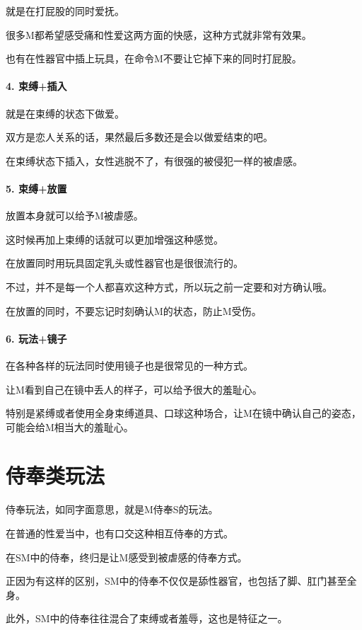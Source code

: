 \documentclass[12pt,UTF8]{ctexbook}
\begin{document}
就是在打屁股的同时爱抚。

很多M都希望感受痛和性爱这两方面的快感，这种方式就非常有效果。

也有在性器官中插上玩具，在命令M不要让它掉下来的同时打屁股。

\paragraph{4. 束缚+插入}

就是在束缚的状态下做爱。

双方是恋人关系的话，果然最后多数还是会以做爱结束的吧。

在束缚状态下插入，女性逃脱不了，有很强的被侵犯一样的被虐感。

\paragraph{5. 束缚+放置}

放置本身就可以给予M被虐感。

这时候再加上束缚的话就可以更加增强这种感觉。

在放置同时用玩具固定乳头或性器官也是很很流行的。

不过，并不是每一个人都喜欢这种方式，所以玩之前一定要和对方确认哦。

在放置的同时，不要忘记时刻确认M的状态，防止M受伤。

\paragraph{6. 玩法+镜子}

在各种各样的玩法同时使用镜子也是很常见的一种方式。

让M看到自己在镜中丢人的样子，可以给予很大的羞耻心。

特别是紧缚或者使用全身束缚道具、口球这种场合，让M在镜中确认自己的姿态，可能会给M相当大的羞耻心。

\section{侍奉类玩法}

侍奉玩法，如同字面意思，就是M侍奉S的玩法。

在普通的性爱当中，也有口交这种相互侍奉的方式。

在SM中的侍奉，终归是让M感受到被虐感的侍奉方式。

正因为有这样的区别，SM中的侍奉不仅仅是舔性器官，也包括了脚、肛门甚至全身。

此外，SM中的侍奉往往混合了束缚或者羞辱，这也是特征之一。
\end{document}
